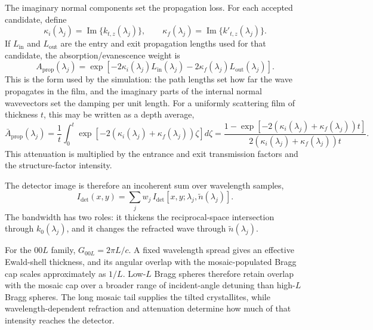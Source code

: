 The imaginary normal components set the propagation loss. For each accepted
candidate, define
\begin{equation}
  \kappa_i(\lambda_j)
  =
  \operatorname{Im}\{k_{t,z}(\lambda_j)\},
  \qquad
  \kappa_f(\lambda_j)
  =
  \operatorname{Im}\{k'_{t,z}(\lambda_j)\} .
  \label{eq:kappa_if_lambda_main}
\end{equation}
If \(L_{\mathrm{in}}\) and \(L_{\mathrm{out}}\) are the entry and exit
propagation lengths used for that candidate, the absorption/evanescence weight
is
\begin{equation}
  A_{\mathrm{prop}}(\lambda_j)
  =
  \exp\!\left[
  -2\kappa_i(\lambda_j)L_{\mathrm{in}}(\lambda_j)
  -2\kappa_f(\lambda_j)L_{\mathrm{out}}(\lambda_j)
  \right].
  \label{eq:imkz_pathlength_weight_main}
\end{equation}
This is the form used by the simulation: the path lengths set how far the wave
propagates in the film, and the imaginary parts of the internal normal
wavevectors set the damping per unit length. For a uniformly scattering film of thickness \(t\),
this may be written as a depth average,
\begin{equation}
  \bar A_{\mathrm{prop}}(\lambda_j)
  =
  \frac{1}{t}\int_0^t
  \exp\!\left[-2\left(\kappa_i(\lambda_j)+\kappa_f(\lambda_j)\right)\zeta\right]
  d\zeta
  =
  \frac{
  1-
  \exp\!\left[-2\left(\kappa_i(\lambda_j)+\kappa_f(\lambda_j)\right)t\right]}
  {2\left(\kappa_i(\lambda_j)+\kappa_f(\lambda_j)\right)t}.
  \label{eq:absorption_lambda_main}
\end{equation}
This attenuation is multiplied by the entrance and exit transmission factors and
the structure-factor intensity.

The detector image is therefore an incoherent sum over wavelength samples,
\begin{equation}
  I_{\mathrm{det}}(x,y)
  =
  \sum_j
  w_j\,
  I_{\mathrm{det}}
  \!\left[
  x,y;
  \lambda_j,
  \tilde n(\lambda_j)
  \right].
  \label{eq:detector_sum_lambda_main}
\end{equation}
The bandwidth has two roles: it thickens the reciprocal-space intersection
through \(k_0(\lambda_j)\), and it changes the refracted wave through
\(\tilde n(\lambda_j)\). 

For the \(00L\) family, \(G_{00L}=2\pi L/c\). A fixed wavelength spread gives
an effective Ewald-shell thickness, and its angular overlap with the
mosaic-populated Bragg cap scales approximately as \(1/L\). Low-\(L\) Bragg
spheres therefore retain overlap with the mosaic cap over a broader range of
incident-angle detuning than high-\(L\) Bragg spheres. The long mosaic tail
supplies the tilted crystallites, while wavelength-dependent refraction and
attenuation determine how much of that intensity reaches the detector.

